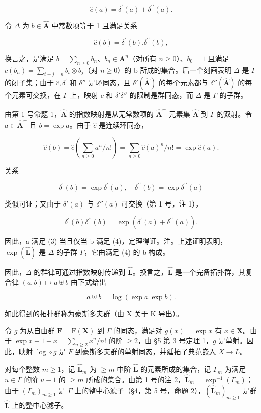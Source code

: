 \[
\hat {c} (a) = \delta^ {\prime} (a) + \delta^ {\prime \prime} (a).\tag{3}
\]

令 \(\Delta\) 为 \(b\in \hat{\mathbf{A}}\) 中常数项等于 1 且满足关系

\[
\hat {c} (b) = \delta^ {\prime} (b). \delta^ {\prime \prime} (b),\tag{4}
\]

换言之，是满足 \(b = \sum_{n\geqslant 0}b_n\)、\(b_{n}\in \mathbf{A}^{n}\)（对所有 \(n\geqslant 0\)）、\(b_0 = 1\) 且满足 \(c(b_{n}) = \sum_{t + j = n}b_{t}\otimes b_{j}\)（对 \(n\geqslant 0\)）的 b 所成的集合。后一个刻画表明 \(\Delta\) 是 \(\Gamma\) 的闭子集；由于 \(\hat c,\delta^{\prime}\) 和 \(\delta ''\) 是环同态，且 \(\delta'(\hat{\mathbf A})\) 的每个元素都与 \(\delta''(\hat{\mathbf A})\) 的每个元素可交换，在 \(\Gamma\) 上，映射 \(c\) 和 \(\delta ' \delta''\) 的限制是群同态，而 \(\Delta\) 是 \(\Gamma\) 的子群。

由第 1 号命题 1，\(\hat{\mathbf{A}}\) 的指数映射是从无常数项的 \(\hat{\mathbf{A}}^{+}\) 元素集 \(\hat{\mathbf{A}}\) 到 \(\Gamma\) 的双射。令 \(a \in \hat{\mathbf{A}}^{+}\) 且 \(b = \exp a\)。由于 \(\hat c\) 是连续环同态，

\[
\hat {c} (b) = \hat {c} \left(\sum_ {n \geqslant 0} a ^ {n} / n!\right) = \sum_ {n \geqslant 0} \hat {c} (a) ^ {n} / n! = \exp \hat {c} (a).
\]

关系

\[
\delta^ {\prime} (b) = \exp \delta^ {\prime} (a), \quad \delta^ {\prime \prime} (b) = \exp \delta^ {\prime \prime} (a)
\]

类似可证；又由于 \(\delta'(a)\) 与 \(\delta''(a)\) 可交换（第 1 号，注 1），

\[
\delta^ {\prime} (b) \delta^ {\prime \prime} (b) = \exp (\delta^ {\prime} (a) + \delta^ {\prime \prime} (a)).
\]

因此，a 满足 (3) 当且仅当 b 满足 (4)，定理得证。注。上述证明表明，\(\exp(\hat{\mathbf{L}})\) 是 \(\Delta\) 的子群 \(\Gamma\)，它由满足 (4) 的 b 构成。

因此，\(\Delta\) 的群律可通过指数映射传递到 \(\hat{\mathbf{L}}\)。换言之，\(\hat{\mathbf{L}}\) 是一个完备拓扑群，其复合律 \((a, b) \mapsto a \uplus b\) 由下式给出

\[
a \uplus b = \log (\exp a. \exp b).
\]

如此得到的拓扑群称为豪斯多夫群（由 X 关于 K 导出）。

令 \(g\) 为从自由群 \(\mathbf{F} = \mathrm{F}(\mathbf{X})\) 到 \(\Gamma\) 的同态，满足对 \(g(x) = \exp x\) 有 \(x \in \mathbf{X}\)。由于 \(\exp x - 1 - x = \sum_{n \geqslant 2} x^n / n!\) 的阶 \(\geqslant 2\)，由 §5 第 3 号定理 1，\(g\) 是单射。因此，映射 \(\log \circ g\) 是 \(F\) 到豪斯多夫群的单射同态，并延拓了典范嵌入 \(X \to L\)。

对每个整数 \(m \geqslant 1\)，记 \(\hat{\mathbf{L}}_m\) 为 \(\geqslant m\) 中阶 \(\hat{\mathbf{L}}\) 的元素所成的集合，记 \(\Gamma_m\) 为满足 \(u \in \Gamma\) 的阶 \(u - 1\) 的 \(\geqslant m\) 所成的集合。由第 1 号的注 2，\(\hat{\mathbf{L}}_m = \exp^{-1}(\Gamma_m)\)；由于 \((\Gamma_m)_{m \geqslant 1}\) 是 \(\Gamma\) 上的整中心滤子（§4，第 5 号，命题 2），\((\hat{\mathbf{L}}_m)_{m \geqslant 1}\) 是群 \(\hat{\mathbf{L}}\) 上的整中心滤子。

